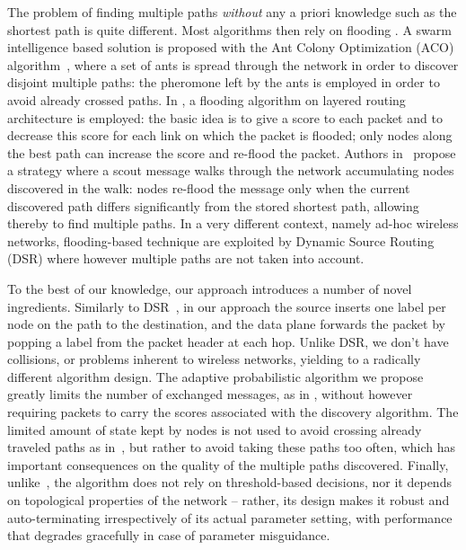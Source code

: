 \documentclass[conference]{IEEEtran}
\begin{document}
The problem of finding multiple paths {\it without} any a priori knowledge such as the shortest path is quite different.
Most algorithms then rely on flooding  \cite{Johnson07Rfc4728,Blesa04Evo,Chen02ANW,Chen98Infocom}.
A swarm intelligence based solution is proposed with  the Ant Colony Optimization (ACO) algorithm~\cite{Blesa04Evo}, where a set of ants is spread through the network in order to discover disjoint multiple paths: the pheromone left by the ants is employed in order to avoid already crossed paths.  In \cite{Chen02ANW}, a flooding algorithm on layered routing architecture is employed: the basic idea is to give a score to each packet and to decrease this score for each link on which the packet is flooded; only nodes along the best path can increase the score and re-flood the packet. Authors in~\cite{Chen98Infocom} propose a strategy where a scout message walks through the network accumulating nodes discovered in the walk: nodes re-flood the message only when  the current discovered path differs significantly from the stored  shortest path, allowing thereby to find multiple paths. 
In a very different context, namely ad-hoc wireless networks, flooding-based technique are exploited by  Dynamic Source Routing (DSR) \cite{Johnson07Rfc4728} where however multiple paths are not taken into account.  

To the best of our knowledge, our approach introduces a number of novel ingredients. Similarly to DSR~\cite{Johnson07Rfc4728}, in our approach the source inserts one label per node on the path to the destination, and the data plane forwards the packet by popping a label from the packet header at each hop.  Unlike DSR, we don't have collisions, or problems inherent to wireless networks, yielding to a radically different algorithm design.
The adaptive  probabilistic algorithm we propose greatly limits the number of exchanged messages, as in \cite{Chen02ANW}, without however requiring packets to carry the scores associated with the discovery algorithm.
The limited amount of state kept by nodes is not used  to avoid crossing already traveled paths as in~\cite{Blesa04Evo}, but  rather to avoid taking these paths too often, which has important consequences on the quality of the multiple paths discovered.
Finally, unlike~\cite{Chen98Infocom}, the algorithm does not rely on  threshold-based decisions, nor it depends on topological properties of the network -- rather, its design makes it robust and auto-terminating irrespectively of its actual parameter setting, with performance that degrades gracefully in case of parameter misguidance.
\end{document}
